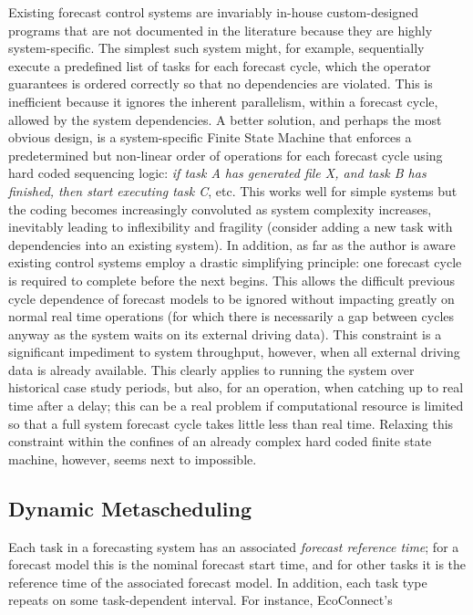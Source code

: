 \documentclass[11pt,a4paper]{article}
\begin{document}
Existing forecast control systems are invariably in-house
custom-designed programs that are not documented in the literature
because they are highly system-specific.  The simplest such system
might, for example, sequentially execute a predefined list of tasks for
each forecast cycle, which the operator guarantees is ordered correctly
so that no dependencies are violated.  This is inefficient because it
ignores the inherent parallelism, within a forecast cycle, allowed by
the system dependencies.  A better solution, and perhaps the most
obvious design, is a system-specific Finite State Machine that enforces
a predetermined but non-linear order of operations for each forecast
cycle using hard coded sequencing logic: {\em if task A has generated
file X, and task B has finished, then start executing task C}, etc. This
works well for simple systems but the coding becomes increasingly
convoluted as system complexity increases, inevitably leading to
inflexibility and fragility (consider adding a new task with
dependencies into an existing system). In addition, as far as the author
is aware existing control systems employ a drastic simplifying
principle: one forecast cycle is required to complete before the next
begins. This allows the difficult previous cycle dependence of forecast
models to be ignored without impacting greatly on normal real time
operations (for which there is necessarily a gap between cycles anyway
as the system waits on its external driving data). This constraint is a
significant impediment to system throughput, however, when all external
driving data is already available. This clearly applies to running the
system over historical case study periods, but also, for an operation,
when catching up to real time after a delay; this can be a real problem
if computational resource is limited so that a full system forecast
cycle takes little less than real time.  Relaxing this constraint within
the confines of an already complex hard coded finite state machine,
however, seems next to impossible.

\subsection{Dynamic Metascheduling}

Each task in a forecasting system has an associated {\em forecast
reference time}; for a forecast model this is the nominal forecast start
time, and for other tasks it is the reference time of the associated
forecast model.  In addition, each task type repeats on some
task-dependent interval.  For instance, EcoConnect's   
\end{document}
